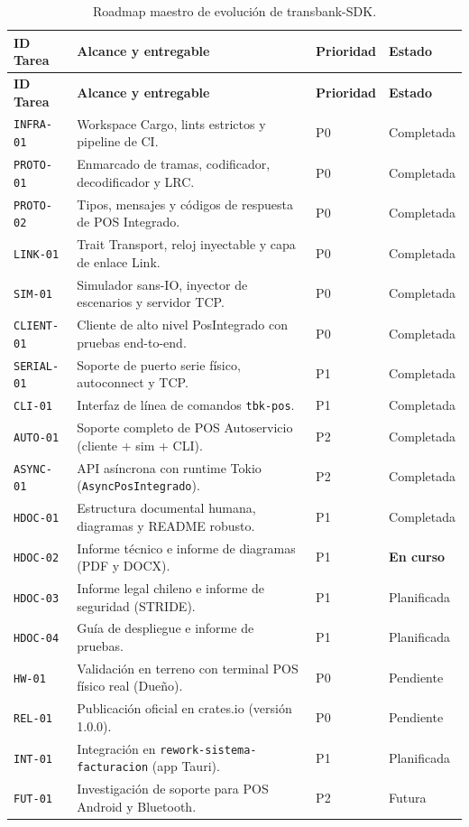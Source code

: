 \documentclass{../../plantilla/raysac-informe}
\begin{document}
\begin{longtable}{@{}p{1.8cm}p{7.2cm}p{2.2cm}p{2.8cm}@{}}
\caption{Roadmap maestro de evolución de transbank-SDK.}\label{tab:roadmap-resumen}\\
\toprule
\textbf{ID Tarea} & \textbf{Alcance y entregable} & \textbf{Prioridad} & \textbf{Estado} \\
\midrule
\endfirsthead
\toprule
\textbf{ID Tarea} & \textbf{Alcance y entregable} & \textbf{Prioridad} & \textbf{Estado} \\
\midrule
\endhead
\bottomrule
\endlastfoot
\texttt{INFRA-01} & Workspace Cargo, lints estrictos y pipeline de CI. & P0 & Completada \\
\texttt{PROTO-01} & Enmarcado de tramas, codificador, decodificador y LRC. & P0 & Completada \\
\texttt{PROTO-02} & Tipos, mensajes y códigos de respuesta de POS Integrado. & P0 & Completada \\
\texttt{LINK-01} & Trait Transport, reloj inyectable y capa de enlace Link. & P0 & Completada \\
\texttt{SIM-01} & Simulador sans-IO, inyector de escenarios y servidor TCP. & P0 & Completada \\
\texttt{CLIENT-01} & Cliente de alto nivel PosIntegrado con pruebas end-to-end. & P0 & Completada \\
\texttt{SERIAL-01} & Soporte de puerto serie físico, autoconnect y TCP. & P1 & Completada \\
\texttt{CLI-01} & Interfaz de línea de comandos \texttt{tbk-pos}. & P1 & Completada \\
\texttt{AUTO-01} & Soporte completo de POS Autoservicio (cliente + sim + CLI). & P2 & Completada \\
\texttt{ASYNC-01} & API asíncrona con runtime Tokio (\texttt{AsyncPosIntegrado}). & P2 & Completada \\
\texttt{HDOC-01} & Estructura documental humana, diagramas y README robusto. & P1 & Completada \\
\texttt{HDOC-02} & Informe técnico e informe de diagramas (PDF y DOCX). & P1 & \textbf{En curso} \\
\texttt{HDOC-03} & Informe legal chileno e informe de seguridad (STRIDE). & P1 & Planificada \\
\texttt{HDOC-04} & Guía de despliegue e informe de pruebas. & P1 & Planificada \\
\texttt{HW-01} & Validación en terreno con terminal POS físico real (Dueño). & P0 & Pendiente \\
\texttt{REL-01} & Publicación oficial en crates.io (versión 1.0.0). & P0 & Pendiente \\
\texttt{INT-01} & Integración en \texttt{rework-sistema-facturacion} (app Tauri). & P1 & Planificada \\
\texttt{FUT-01} & Investigación de soporte para POS Android y Bluetooth. & P2 & Futura \\
\end{longtable}
\end{document}
